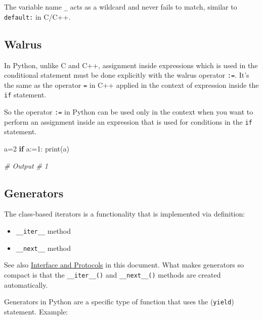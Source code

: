 \documentclass[
]{article}
\newenvironment{Shaded}{}{}
\newcommand{\BuiltInTok}[1]{#1}
\newcommand{\CommentTok}[1]{\textcolor[rgb]{0.38,0.63,0.69}{\textit{#1}}}
\newcommand{\ControlFlowTok}[1]{\textcolor[rgb]{0.00,0.44,0.13}{\textbf{#1}}}
\newcommand{\DecValTok}[1]{\textcolor[rgb]{0.25,0.63,0.44}{#1}}
\newcommand{\NormalTok}[1]{#1}
\newcommand{\OperatorTok}[1]{\textcolor[rgb]{0.40,0.40,0.40}{#1}}
\begin{document}
The variable name \texttt{\_} acts as a wildcard and never fails to
match, similar to \texttt{default:} in C/C++.

\hypertarget{walrus}{%
\subsection{Walrus}\label{walrus}}

In Python, unlike C and C++, assignment inside expressions which is used
in the conditional statement must be done explicitly with the walrus
operator \texttt{:=}. It's the same as the operator \texttt{=} in C++
applied in the context of expression inside the \texttt{if} statement.

So the operator \texttt{:=} in Python can be used only in the context
when you want to perform an assignment inside an expression that is used
for conditions in the \texttt{if} statement.

\begin{Shaded}
\begin{Highlighting}[]
\NormalTok{a}\OperatorTok{=}\DecValTok{2}
\ControlFlowTok{if}\NormalTok{ a:}\OperatorTok{=}\DecValTok{1}\NormalTok{:}
  \BuiltInTok{print}\NormalTok{(a)}

\CommentTok{\# Output}
\CommentTok{\# 1}
\end{Highlighting}
\end{Shaded}

\hypertarget{generators}{%
\subsection{Generators}\label{generators}}

The class-based iterators is a functionality that is implemented via
definition:

\begin{itemize}
\item
  \texttt{\_\_iter\_\_} method
\item
  \texttt{\_\_next\_\_} method
\end{itemize}

See also \protect\hyperlink{interfaces-and-protocols}{Interface and
Protocols} in this document. What makes generators so compact is that
the \texttt{\_\_iter\_\_()} and \texttt{\_\_next\_\_()} methods are
created automatically.

Generators in Python are a specific type of function that uses the
(\texttt{yield}) statement. Example:
\end{document}
